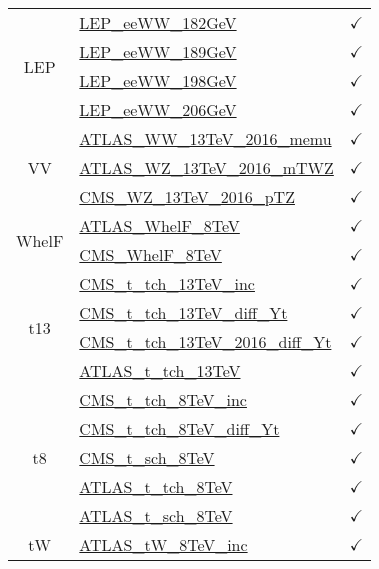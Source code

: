 \documentclass{article}
\begin{document}
\begin{table}[H]
\begin{tabular}{|c|l|c|}
\multirow{4}{*}{LEP}
 & \href{https://arxiv.org/abs/1302.3415}{LEP_eeWW_182GeV}  & $\checkmark$\\ \cline{2-3}
 & \href{https://arxiv.org/abs/1302.3415}{LEP_eeWW_189GeV}  & $\checkmark$\\ \cline{2-3}
 & \href{https://arxiv.org/abs/1302.3415}{LEP_eeWW_198GeV}  & $\checkmark$\\ \cline{2-3}
 & \href{https://arxiv.org/abs/1302.3415}{LEP_eeWW_206GeV}  & $\checkmark$
\\ \hline
\multirow{3}{*}{VV}
 & \href{https://arxiv.org/abs/1905.04242}{ATLAS_WW_13TeV_2016_memu}  & $\checkmark$\\ \cline{2-3}
 & \href{https://arxiv.org/abs/1902.05759}{ATLAS_WZ_13TeV_2016_mTWZ}  & $\checkmark$\\ \cline{2-3}
 & \href{https://arxiv.org/abs/1901.03428}{CMS_WZ_13TeV_2016_pTZ}  & $\checkmark$
\\ \hline
\multirow{2}{*}{WhelF}
 & \href{https://arxiv.org/abs/1612.02577}{ATLAS_WhelF_8TeV}  & $\checkmark$\\ \cline{2-3}
 & \href{https://arxiv.org/abs/1605.09047}{CMS_WhelF_8TeV}  & $\checkmark$
\\ \hline
\multirow{4}{*}{t13}
 & \href{https://arxiv.org/abs/1610.00678}{CMS_t_tch_13TeV_inc}  & $\checkmark$\\ \cline{2-3}
 & \href{https://cds.cern.ch/record/2151074}{CMS_t_tch_13TeV_diff_Yt}  & $\checkmark$\\ \cline{2-3}
 & \href{https://arxiv.org/abs/1907.08330}{CMS_t_tch_13TeV_2016_diff_Yt}  & $\checkmark$\\ \cline{2-3}
 & \href{https://arxiv.org/abs/1609.03920}{ATLAS_t_tch_13TeV}  & $\checkmark$
\\ \hline
\multirow{5}{*}{t8}
 & \href{https://arxiv.org/abs/1403.7366}{CMS_t_tch_8TeV_inc}  & $\checkmark$\\ \cline{2-3}
 & \href{https://cds.cern.ch/record/1956681}{CMS_t_tch_8TeV_diff_Yt}  & $\checkmark$\\ \cline{2-3}
 & \href{https://arxiv.org/abs/1603.02555}{CMS_t_sch_8TeV}  & $\checkmark$\\ \cline{2-3}
 & \href{https://arxiv.org/abs/1702.02859}{ATLAS_t_tch_8TeV}  & $\checkmark$\\ \cline{2-3}
 & \href{https://arxiv.org/abs/1511.05980}{ATLAS_t_sch_8TeV}  & $\checkmark$
\\ \hline
\multirow{5}{*}{tW}
 & \href{https://arxiv.org/abs/1510.03752}{ATLAS_tW_8TeV_inc}  & $\checkmark$\\ \cline{2-3}

\end{tabular}
\end{table}
\end{document}
